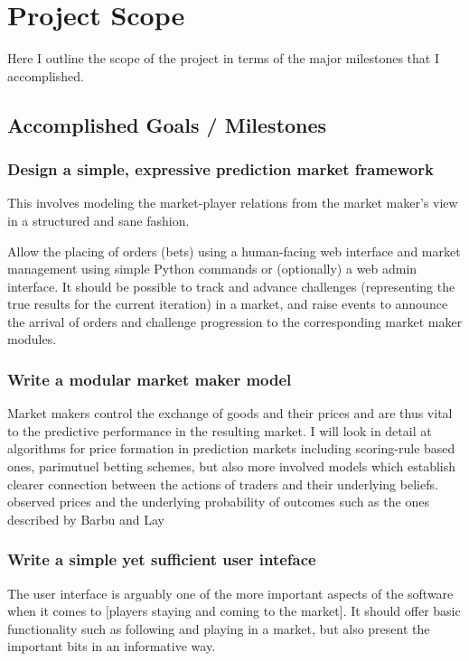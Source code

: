 \documentclass[bsc,frontabs,twoside,singlespacing,parskip,deptreport]{infthesis}     %
\begin{document}
\chapter{Project Scope}
	Here I outline the scope of the project in terms of the major milestones that I accomplished. 

\section{Accomplished Goals / Milestones}	

\subsection{Design a simple, expressive prediction market framework}
	This involves modeling the market-player relations from the market maker’s view in a structured and sane fashion. 

Allow the placing of orders (bets) using a human-facing web interface and market management using simple Python commands or (optionally) a web admin interface. It should be possible to track and advance challenges (representing the true results for the current iteration) in a market, and raise events to announce the arrival of orders and challenge progression to the corresponding market maker modules. 

\subsection{Write a modular market maker model}

Market makers control the exchange of goods and their prices and are thus vital to the predictive performance in the resulting market. I will look in detail at algorithms for price formation in prediction markets including scoring-rule based ones, parimutuel betting schemes, but also more involved models which establish clearer connection between the actions of traders and their underlying beliefs. observed prices and the underlying probability of outcomes such as the ones described by Barbu and Lay 

\subsection{Write a simple yet sufficient user inteface}
	The user interface is arguably one of the more important aspects of the software when it comes to [players staying and coming to the market]. It should offer basic functionality such as following and playing in a market, but also present the important bits in an informative way. 
	
\end{document}
